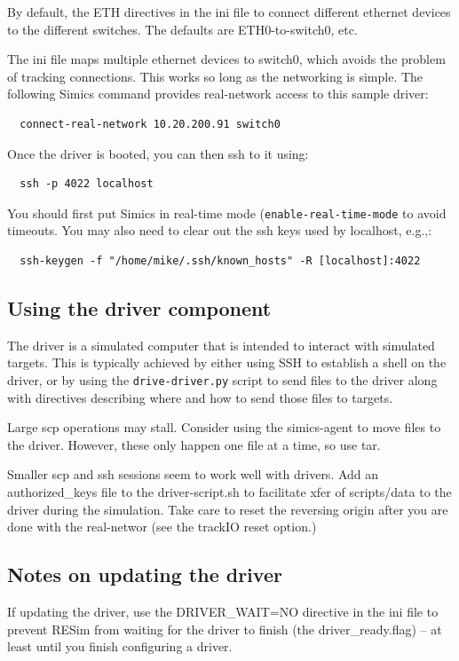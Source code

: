 \documentclass[titlepage]{article}
\begin{document}
\begin{appendices}
By default, the ETH directives in the ini file to connect different ethernet devices to the
different switches.  The defaults are ETH0-to-switch0, etc.

The ini file maps multiple ethernet devices to switch0, which avoids the problem of
tracking connections.  This works so long as the networking is simple.
The following Simics command provides real-network access to this sample driver:
\begin{verbatim}
  connect-real-network 10.20.200.91 switch0
\end{verbatim}
Once the driver is booted, you can then ssh to it using:
\begin{verbatim}
  ssh -p 4022 localhost
\end{verbatim}
You should first put Simics in real-time mode ({\tt enable-real-time-mode} to avoid timeouts.  You may also need to clear out the
ssh keys used by localhost, e.g.,:
\begin{verbatim}
  ssh-keygen -f "/home/mike/.ssh/known_hosts" -R [localhost]:4022
\end{verbatim}

\subsection{Using the driver component}
The driver is a simulated computer that is intended to interact with simulated targets.  This is typically
achieved by either using SSH to establish a shell on the driver, or by using the {\tt drive-driver.py}
script to send files to the driver along with directives describing where and how to send those files to
targets.

Large scp operations may stall.  Consider using the simics-agent to move files to the driver.  However,
these only happen one file at a time, so use tar.

Smaller scp and ssh sessions seem to work well with drivers.  Add an authorized\_keys file to the driver-script.sh to facilitate xfer of scripts/data to the driver
during the simulation.  Take care to reset the reversing origin after you are done with the real-networ (see the trackIO reset option.)


\subsection{Notes on updating the driver}
If updating the driver, use the DRIVER\_WAIT=NO directive in the ini file to prevent RESim from waiting for the driver to finish 
(the driver\_ready.flag) -- at least until you finish configuring a driver.


\end{appendices}
\end{document}
